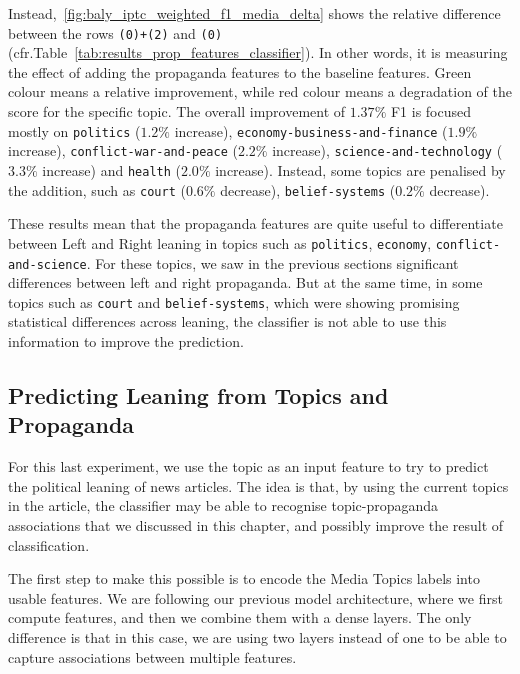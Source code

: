 Instead,~\ref{fig:baly_iptc_weighted_f1_media_delta} shows the relative difference between the rows \texttt{(0)+(2)} and \texttt{(0)} (cfr.Table~\ref{tab:results_prop_features_classifier}).
In other words, it is measuring the effect of adding the propaganda features to the baseline features. Green colour means a relative improvement, while red colour means a degradation of the score for the specific topic.
The overall improvement of $1.37\%$ F1 is focused mostly on \texttt{politics} ($1.2\%$ increase), \texttt{economy-business-and-finance} ($1.9\%$ increase), \texttt{conflict-war-and-peace} ($2.2\%$ increase), \texttt{science-and-technology} ($3.3\%$ increase) and \texttt{health} ($2.0\%$ increase). Instead, some topics are penalised by the addition, such as \texttt{court} ($0.6\%$ decrease), \texttt{belief-systems} ($0.2\%$ decrease).

These results mean that the propaganda features are quite useful to differentiate between Left and Right leaning in topics such as \texttt{politics}, \texttt{economy}, \texttt{conflict-and-science}. For these topics, we saw in the previous sections significant differences between left and right propaganda.
But at the same time, in some topics such as \texttt{court} and \texttt{belief-systems}, which were showing promising statistical differences across leaning, the classifier is not able to use this information to improve the prediction.

\subsection{\statusgreen Predicting Leaning from Topics and Propaganda}
\label{sec:topic_classifier_propaganda_feature}

For this last experiment, we use the topic as an input feature to try to predict the political leaning of news articles.
%
The idea is that, by using the current topics in the article, the classifier may be able to recognise topic-propaganda associations that we discussed in this chapter, and possibly improve the result of classification.

The first step to make this possible is to encode the Media Topics labels into usable features. We are following our previous model architecture, where we first compute features, and then we combine them with a dense layers. The only difference is that in this case, we are using two layers instead of one to be able to capture associations between multiple features.

